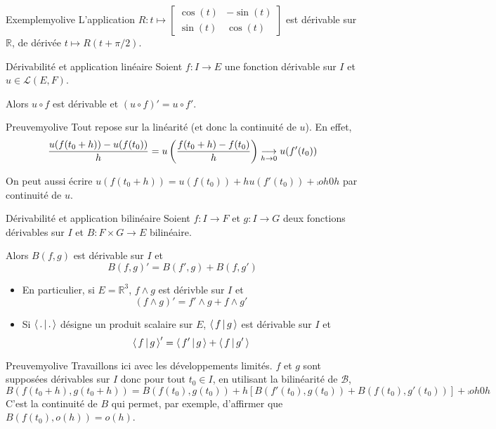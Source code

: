     \begin{omed}{Exemple}{myolive}
        L’application $R : t \mapsto \begin{bmatrix}
            \cos(t) & -\sin(t) \\
            \sin(t) & \cos(t)
        \end{bmatrix}$ est dérivable sur $\mathbb{R}$, de dérivée $t \mapsto R(t + \pi / 2)$.
    \end{omed}

    \begin{prop}{Dérivabilité et application linéaire}{}
        Soient $f : I \to E$ une fonction dérivable sur $I$ et $u \in \mathcal{L}(E,F)$.

        Alors $u \circ f$ est dérivable et $\left(u \circ f\right)' = u \circ f'$.
    \end{prop}

    \begin{demo}{Preuve}{myolive}
        Tout repose sur la linéarité (et donc la continuité de $u$). En effet, 
        \[ \frac{u(f(t_0 + h)) - u(f(t_0))}{h} = u \left(\frac{f(t_0 + h) - f(t_0)}{h}\right) \underset{h \rightarrow 0}{\longrightarrow} u(f'(t_0)) \]

        On peut aussi écrire $u(f(t_0 + h)) = u(f(t_0)) + h u(f'(t_0)) + \comp{o}{h}{0}{h}$ par continuité de $u$.
    \end{demo}

    \begin{prop}{Dérivabilité et application bilinéaire}{}
        Soient $f : I \to F$ et $g : I \to G$ deux fonctions dérivables sur $I$ et $B : F \times G \to E$ bilinéaire.

        Alors $B(f,g)$ est dérivable sur $I$ et 
        \[ B(f,g)' = B(f',g) + B(f,g') \]
    \end{prop}

    \begin{itemize}
        \item En particulier, si $E = \mathbb{R}^3$, $f \wedge g$ est dérivble sur $I$ et 
        \[ \left(f \wedge g\right)' = f' \wedge g + f \wedge g' \]   
        \item Si $\left<\,.\,\middle|\,.\,\right>$ désigne un produit scalaire sur $E$, $\left<\,f\,\middle|\,g\,\right>$ est dérivable sur $I$ et 
        \[ \left<\,f\,\middle|\,g\,\right>' = \left<\,f'\,\middle|\,g\,\right> + \left<\,f\,\middle|\,g'\,\right> \]   
    \end{itemize}

    \begin{demo}{Preuve}{myolive}
        Travaillons ici avec les développements limités. $f$ et $g$ sont supposées dérivables sur $I$ donc pour tout $t_0 \in I$, en utilisant la bilinéarité de $\mathcal{B}$,
        \[ B\left(f(t_0 + h), g(t_0 + h)\right) = B\left(f(t_0),g(t_0)\right) + h \left[B\left( f'(t_0), g(t_0) \right) + B\left(f(t_0), g'(t_0)\right)\right] + \comp{o}{h}{0}{h} \]
        C’est la continuité de $B$ qui permet, par exemple, d’affirmer que $B(f(t_0), o(h)) = o(h)$.
    \end{demo}

